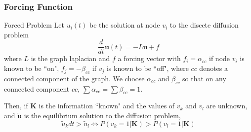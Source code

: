 \documentclass{beamer}
\renewcommand{\b}{\bm}
\begin{document}
\begin{frame}
\frametitle{Forcing Function}
\begin{block}{Forced Problem}
	Let $u_i(t)$ be the solution at node $v_i$ to the discete diffusion problem
	\[
	\frac{d}{dt}\b{u}(t)  = - L\b{u} + f
	\]
	where $L$ is the  graph laplacian and $f$ a forcing vector with $f_i = \alpha_{cc}$ if node $v_i$ is known to be ``on", $f_j = -\beta_{cc}$ if $v_j$ is known to be ``off", where $cc$ denotes a connected component of the graph. We choose $\alpha_{cc}$ and $\beta_{cc}$ so that on any connected component $cc$, $\sum \alpha_{cc}= \sum \beta_{cc}= 1$. 
	
	Then, if $\b{K}$ is the information ``known" and the values of $v_{k}$ and $v_{l}$ are unknown, and $\b{\tilde{u}}$ is the equilibrium solution to the diffusion problem,
	\[
	\tilde{u}_k dt >  \tilde{u}_l \Leftrightarrow  P(v_k=  1|\b{K}) > P(v_l = 1|\b{K})
	\]
\end{block}
\end{frame}
\end{document}
